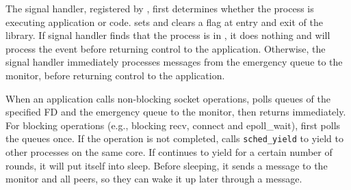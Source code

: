 The signal handler, registered by \libipc{}, first determines whether the process is executing application or \libipc{} code. \libipc{} sets and clears a flag at entry and exit of the library. If signal handler finds that the process is in \libipc, it does nothing and \libipc{} will process the event before returning control to the application. Otherwise, the signal handler immediately processes messages from the emergency queue to the monitor, before returning control to the application. 

When an application calls non-blocking socket operations, \libipc{} polls queues of the specified FD and the emergency queue to the monitor, then returns immediately. For blocking operations (e.g., blocking recv, connect and epoll\_wait), \libipc{} first polls the queues once. If the operation is not completed, \libipc{} calls \texttt{sched\_yield} to yield to other processes on the same core. %
If \libipc{} continues to yield for a certain number of rounds, it will put itself into sleep. Before sleeping, it sends a message to the monitor and all peers, so they can wake it up later through a message.


